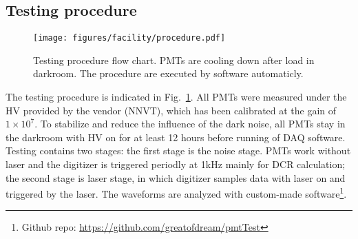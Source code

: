 \subsection{Testing procedure}
\begin{figure}
    \centering
    \texttt{[image: figures/facility/procedure.pdf]}
    \caption{Testing procedure flow chart. PMTs are cooling down after load in darkroom. The procedure are executed by software automaticly.}
    \label{fig:testingprocedure}
\end{figure}
The testing procedure is indicated in Fig.~\ref{fig:testingprocedure}. All PMTs were measured under the HV provided by the vendor (NNVT), which has been calibrated at the gain of $1\times10^7$. To stabilize and reduce the influence of the dark noise, all PMTs stay in the darkroom with HV on for at least 12 hours before running of DAQ software. Testing contains two stages: the first stage is the noise stage. PMTs work without laser and the digitizer is triggered periodly at 1kHz mainly for DCR calculation; the second stage is laser stage, in which digitizer samples data with laser on and triggered by the laser. The waveforms are analyzed with custom-made software\footnote{Github repo: \url{https://github.com/greatofdream/pmtTest}}.